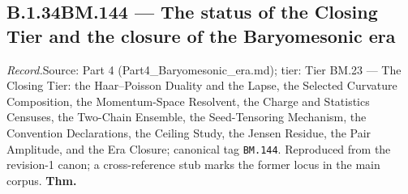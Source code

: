 \documentclass[11pt,openany]{report}
\theoremstyle{canonplain}
\theoremstyle{canondef}
\begin{document}
\medskip
\subsection*{\texorpdfstring{B.1.34\quad BM.144 — The status of the Closing Tier and the closure of the Baryomesonic era}{BM.144 B.1.34}}
\label{tag:BM-144}
{\small \textit{Record.}\quad Source: Part 4 (Part4\_Baryomesonic\_era.md); tier: Tier BM.23 — The Closing Tier: the Haar–Poisson Duality and the Lapse, the Selected Curvature Composition, the Momentum-Space Resolvent, the Charge and Statistics Censuses, the Two-Chain Ensemble, the Seed-Tensoring Mechanism, the Convention Declarations, the Ceiling Study, the Jensen Residue, the Pair Amplitude, and the Era Closure; canonical tag \texttt{BM.144}. Reproduced from the revision-1 canon; a cross-reference stub marks the former locus in the main corpus.}
\medskip
\textbf{Thm.}
\end{document}
